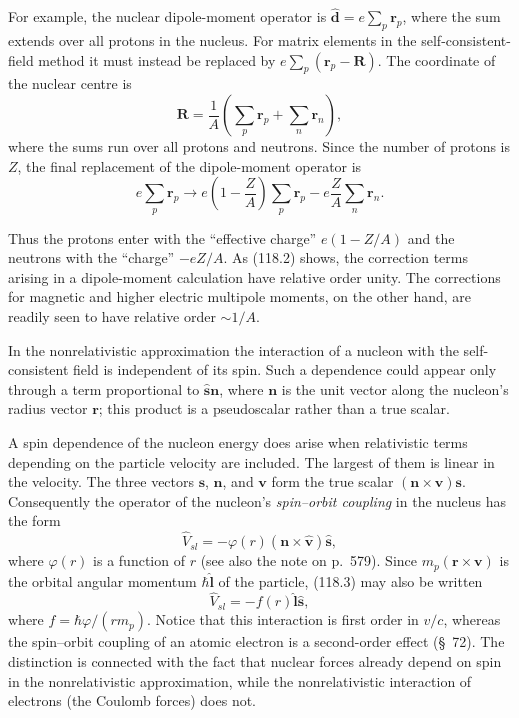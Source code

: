 For example, the nuclear dipole-moment operator is
$\hat{\mathbf d}=e\sum_p\mathbf r_p$, where the sum extends over all protons
in the nucleus. For matrix elements in the self-consistent-field method it
must instead be replaced by $e\sum_p(\mathbf r_p-\mathbf R)$. The coordinate
of the nuclear centre is
\[
 \mathbf R=\frac1A\left(\sum_p\mathbf r_p+\sum_n\mathbf r_n\right),
\]
where the sums run over all protons and neutrons. Since the number of protons
is $Z$, the final replacement of the dipole-moment operator is
\begin{equation}
 e\sum_p\mathbf r_p\to
 e\left(1-\frac ZA\right)\sum_p\mathbf r_p
 -e\frac ZA\sum_n\mathbf r_n.
 \tag{118.2}
\end{equation}

Thus the protons enter with the ``effective charge'' $e(1-Z/A)$ and the
neutrons with the ``charge'' $-eZ/A$. As (118.2) shows, the correction terms
arising in a dipole-moment calculation have relative order unity. The
corrections for magnetic and higher electric multipole moments, on the other
hand, are readily seen to have relative order $\sim1/A$.

In the nonrelativistic approximation the interaction of a nucleon with the
self-consistent field is independent of its spin. Such a dependence could
appear only through a term proportional to $\hat{\mathbf s}\mathbf n$, where
$\mathbf n$ is the unit vector along the nucleon's radius vector $\mathbf r$;
this product is a pseudoscalar rather than a true scalar.

A spin dependence of the nucleon energy does arise when relativistic terms
depending on the particle velocity are included. The largest of them is
linear in the velocity. The three vectors $\mathbf s$, $\mathbf n$, and
$\mathbf v$ form the true scalar $(\mathbf n\times\mathbf v)\mathbf s$.
Consequently the operator of the nucleon's \emph{spin--orbit coupling} in the
nucleus has the form
\begin{equation}
 \hat V_{sl}=-\varphi(r)(\mathbf n\times\hat{\mathbf v})\hat{\mathbf s},
 \tag{118.3}
\end{equation}
where $\varphi(r)$ is a function of $r$ (see also the note on p.~579). Since
$m_p(\mathbf r\times\mathbf v)$ is the orbital angular momentum
$\hbar\hat{\mathbf l}$ of the particle, (118.3) may also be written
\begin{equation}
 \hat V_{sl}=-f(r)\hat{\mathbf l}\hat{\mathbf s},
 \tag{118.4}
\end{equation}
where $f=\hbar\varphi/(rm_p)$. Notice that this interaction is first order in
$v/c$, whereas the spin--orbit coupling of an atomic electron is a
second-order effect (\S~72). The distinction is connected with the fact that
nuclear forces already depend on spin in the nonrelativistic approximation,
while the nonrelativistic interaction of electrons (the Coulomb forces) does
not.

